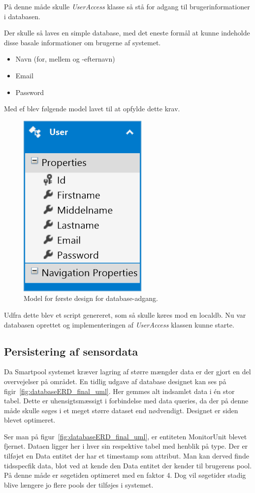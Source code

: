 På denne måde skulle \textit{UserAccess} klasse så stå for adgang til brugerinformationer i databasen. 

Der skulle så laves en simple database, med det eneste formål at kunne indeholde disse basale informationer om brugerne af systemet.

\begin{itemize}
	\item Navn (for, mellem og -efternavn)
	\item Email
	\item Password
\end{itemize}

Med \gls{ef} blev følgende model lavet til at opfylde dette krav.

\begin{figure}[h]
	\centering
	\includegraphics[width=0.25\linewidth]{figs/design/database_model_1}
	\caption{Model for første design for database-adgang.}
	\label{fig:database_model_1}
\end{figure}

Udfra dette blev et script genereret, som så skulle køres mod en localdb. Nu var databasen oprettet og implementeringen af \textit{UserAccess} klassen kunne starte.

\subsection{Persistering af sensordata}
Da Smartpool systemet kræver lagring af større mængder data er der gjort en del overvejelser på området. 
En tidlig udgave af database designet kan ses på figir~\ref{fig:databaseERD_final_uml}. Her gemmes alt indsamlet data i én stor tabel. Dette er uhensigtsmæssigt i forbindelse med data queries, da der på denne måde skulle søges i et meget større dataset end nødvendigt. Designet er siden blevet optimeret. 

Ser man på figur~\ref{fig:databaseERD_final_uml}, er entiteten MonitorUnit blevet fjernet. Dataen ligger her i hver sin respektive tabel med henblik på type. Der er tilføjet en Data entitet der har et timestamp som attribut. Man kan derved finde tidsspecfik data, blot ved at kende den Data entitet der kender til brugerens pool. På denne måde er søgetiden optimeret med en faktor 4. Dog vil søgetider stadig blive længere jo flere pools der tilføjes i systemet.

